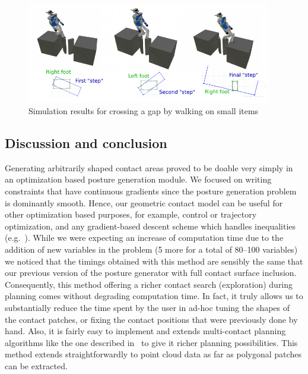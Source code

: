 \begin{figure}[!htb]
  \centering
  \includegraphics[width=0.95\textwidth]{riviere3steps.pdf}
  \caption{Simulation results for crossing a gap by walking on small items}
\label{fig:riviere}
\end{figure}



\subsection{Discussion and conclusion}


Generating arbitrarily shaped contact areas proved to be doable very simply in an optimization based posture generation module.
We focused on writing constraints that have continuous gradients since the posture generation problem is dominantly smooth.
Hence, our geometric contact model can be useful for other optimization based purposes, for example, control or trajectory optimization, and any gradient-based descent scheme which handles inequalities (e.g.~\cite{escande:icra:2010}).
While we were expecting an increase of computation time due to the addition of new variables in the problem (5 more for a total of 80--100 variables)
we noticed that the timings obtained with this method are sensibly the same that our previous version of the posture generator with full contact surface inclusion.
Consequently, this method offering a richer contact search (exploration) during planning comes without degrading computation time.
In fact, it truly allows us to substantially reduce the time spent by the user in ad-hoc tuning the shapes of the contact patches, or fixing the contact positions that were previously done by hand.
Also, it is fairly easy to implement and extends multi-contact planning algorithms like the one described in~\cite{escande:ras:2013}{} to give it richer planning possibilities.
This method extends straightforwardly to point cloud data as far as polygonal patches can be extracted.

